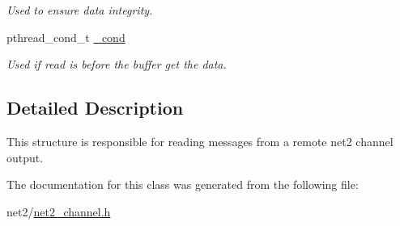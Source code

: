 \begin{DoxyCompactItemize}
\begin{DoxyCompactList}\small\item\em Used to ensure data integrity. \end{DoxyCompactList}\item 
\hypertarget{structnet2__channel__input__t_a1cd9ede6cdabb64e0381fa2eea57f71d}{pthread\-\_\-cond\-\_\-t \hyperlink{structnet2__channel__input__t_a1cd9ede6cdabb64e0381fa2eea57f71d}{\-\_\-cond}}\label{structnet2__channel__input__t_a1cd9ede6cdabb64e0381fa2eea57f71d}

\begin{DoxyCompactList}\small\item\em Used if read is before the buffer get the data. \end{DoxyCompactList}\end{DoxyCompactItemize}


\subsection{Detailed Description}
This structure is responsible for reading messages from a remote net2 channel output. 

The documentation for this class was generated from the following file\-:\begin{DoxyCompactItemize}
\item 
net2/\hyperlink{net2__channel_8h}{net2\-\_\-channel.\-h}\end{DoxyCompactItemize}
